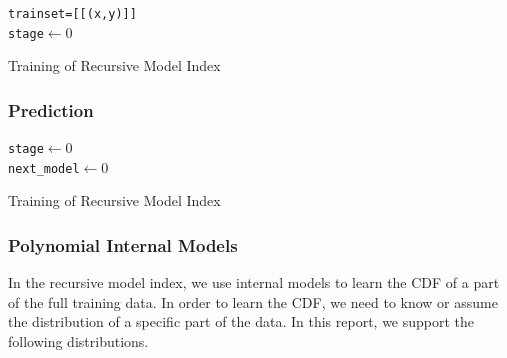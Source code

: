 \begin{algorithm}[H]
    \SetAlgoLined
     \texttt{trainset=[[(x,y)]]} \\
     \texttt{stage$\gets 0$} \\
     \caption{Training of Recursive Model Index}
\end{algorithm}

\subsubsection{Prediction}

\begin{algorithm}[H]
    \SetAlgoLined
     \texttt{stage$\gets 0$} \\
 	 \texttt{next\_model$\gets 0$} \\
     \caption{Training of Recursive Model Index}
\end{algorithm}

\subsubsection{Polynomial Internal Models}

In the recursive model index, we use internal models to learn the CDF of a part of the full training data. In order to learn the CDF, we need to know or assume the distribution of a specific part of the data. In this report, we support the following distributions.

